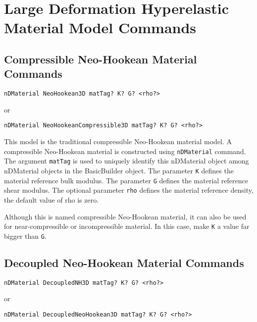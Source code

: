 
\section{Large Deformation Hyperelastic Material Model Commands}


\subsection{Compressible Neo-Hookean Material Commands}
\label{CompNH}

\begin{verbatim}
nDMaterial NeoHookean3D matTag? K? G? <rho?> 
\end{verbatim}
or
\begin{verbatim}
nDMaterial NeoHookeanCompressible3D matTag? K? G? <rho?> 
\end{verbatim}

This model is the traditional compressible Neo-Hookean material model.
A compressible Neo-Hookean material is constructed using \texttt{nDMaterial} command.
The argument \texttt{matTag} is used to uniquely identify this nDMaterial object among 
nDMaterial objects in the BasicBuilder object. 
The parameter \texttt{K} defines the material reference bulk modulus. 
The parameter \texttt{G} defines the material reference shear modulus. 
The optional parameter \texttt{rho} defines the material reference density, 
the default value of rho is zero.  
  
Although this is named compressible Neo-Hookean material, it can also be used for 
near-compressible or incompressible material. In this case, 
make \texttt{K} a value far bigger than \texttt{G}.  


\subsection{Decoupled Neo-Hookean Material Commands}
\label{DNH}

\begin{verbatim}
nDMaterial DecoupledNH3D matTag? K? G? <rho?> 
\end{verbatim}
or
\begin{verbatim}
nDMaterial DecoupledNeoHookean3D matTag? K? G? <rho?> 
\end{verbatim}

